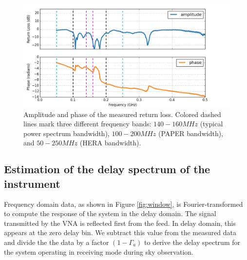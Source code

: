 \documentclass[iop]{emulateapj}
\begin{document}

\begin{figure}
\centering
\includegraphics[totalheight=0.3\textheight]{plots/frequency_amp_phase_fullbw.png}
\caption{Amplitude and phase of the measured return loss. Colored dashed lines
mark three different frequency bands: $140-160MHz$ (typical power spectrum bandwidth),
$100-200MHz$ (PAPER bandwidth), and
$50-250MHz$ (HERA bandwidth).}
\label{fig:freq}
\end{figure}

\subsection{Estimation of the delay spectrum of the instrument}
Frequency domain data, as shown in Figure \ref{fig:window}, is Fourier-transformed to compute the response of the system in the delay domain. The signal transmitted by the VNA is reflected first from the feed. In delay domain,  this appears at the zero delay bin. We subtract this value from the measured data and divide the the data by a factor $(1-\Gamma_{a})$ to derive the delay spectrum for the system operating in receiving mode during sky observation.   %
\end{document}
